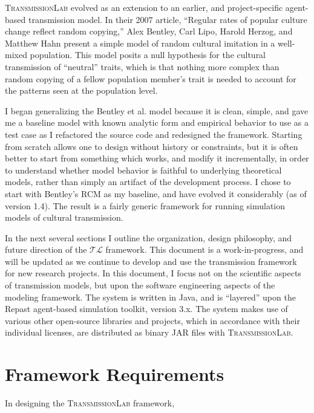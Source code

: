 \documentclass[noid]{kluwer-mem-proposal}
\newcommand{\tlfull}{\textsc{TransmissionLab}\xspace}
\newcommand{\tlshort}{\ensuremath{\mathcal{TL}}\xspace}
\begin{document}
\begin{article}
\tlfull evolved as an extension to an earlier, and project-specific agent-based transmission model. 
In their 2007 article, ``Regular rates of popular culture change reflect random copying,'' Alex Bentley, 
Carl Lipo, Harold Herzog, and Matthew Hahn present a simple model of random cultural imitation in a well-mixed
population.  This model posits a null hypothesis for the cultural transmission of ``neutral'' traits, which 
is that nothing more complex than random copying of a fellow population member's trait is needed to 
account for the patterns seen at the population level.  


I began generalizing the Bentley et al. model because it is clean,
simple, and gave me a baseline model with known analytic form and empirical behavior to use as a test case as I refactored the source code and redesigned the framework.   Starting from scratch allows
one to design without history or constraints, but it is often better to start
from something which works, and modify it incrementally, in order to understand whether model behavior is faithful to underlying theoretical models, rather than simply an artifact of the development process.  I chose to start with Bentley's RCM as my baseline, and have evolved it considerably (as of version 1.4).  The result is a fairly generic framework for running 
simulation models of cultural transmission.  

In the next several sections I outline the organization, design philosophy, and future direction of the \tlshort framework.  This document is a work-in-progress, and will be updated as we continue to develop and use the transmission framework for new research projects.  In this document, I focus not on the scientific aspects of transmission models, but upon the software engineering
aspects of the modeling framework.  The system is written in Java, and is ``layered'' upon the Repast agent-based simulation toolkit, version 3.x.  The system makes use of various other open-source libraries and projects, which in accordance with their individual licenses, are distributed as binary JAR files with \tlfull.

\section{Framework Requirements}
In designing the \tlfull framework, 




\end{article}
\end{document}
